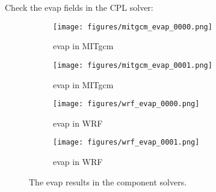 
Check the evap fields in the CPL solver:

\begin{figure}[h!]
\centering
  \begin{subfigure}[b]{0.45\linewidth}
  \texttt{[image: figures/mitgcm\_evap\_0000.png]}
  \caption{evap in MITgcm}
  \end{subfigure}
  \begin{subfigure}[b]{0.45\linewidth}
  \texttt{[image: figures/mitgcm\_evap\_0001.png]}
  \caption{evap in MITgcm}
  \end{subfigure}
  \hspace{0.1in}
  \begin{subfigure}[b]{0.45\linewidth}
  \texttt{[image: figures/wrf\_evap\_0000.png]}
  \caption{evap in WRF}
  \end{subfigure}
  \begin{subfigure}[b]{0.45\linewidth}
  \texttt{[image: figures/wrf\_evap\_0001.png]}
  \caption{evap in WRF}
  \end{subfigure}
\caption{The evap results in the component solvers.}
\label{fig:q2}
\end{figure}
